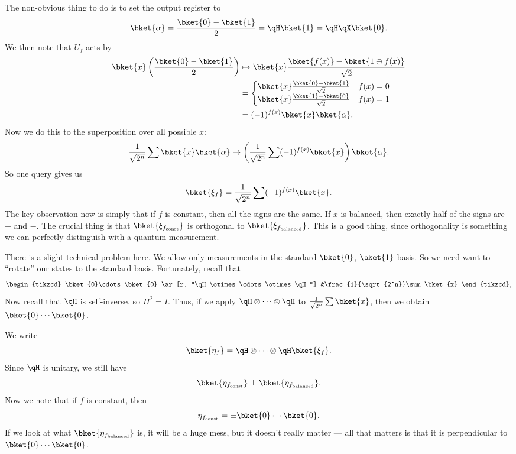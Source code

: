 \documentclass[a4paper]{article}
\begin{document}
\begin{eg}
  The non-obvious thing to do is to set the output register to
  \[
    \bket{\alpha} = \frac{\bket{0} - \bket{1}}{2} = \qH\bket{1} = \qH \qX \bket{0}.
  \]
  We then note that $U_f$ acts by
  \begin{align*}
    \bket{x}\left(\frac{\bket{0} - \bket{1}}{2}\right) &\mapsto \bket{x} \frac{\bket{f(x)} - \bket{1 \oplus f(x)}}{\sqrt{2}}\\
    &=
    \begin{cases}
      \bket{x}\frac{\bket{0} - \bket{1}}{\sqrt{2}}& f(x) = 0\\
      \bket{x}\frac{\bket{1} - \bket{0}}{\sqrt{2}}& f(x) = 1\\
    \end{cases}\\
    &= (-1)^{f(x)}\bket{x}\bket{\alpha}.
  \end{align*}
  Now we do this to the superposition over all possible $x$:
  \[
    \frac{1}{\sqrt{2^n}} \sum \bket{x}\bket{\alpha} \mapsto \left(\frac{1}{\sqrt{2^n}} \sum (-1)^{f(x)}\bket{x}\right) \bket{\alpha}.
  \]
  So one query gives us
  \[
    \bket{\xi_f} = \frac{1}{\sqrt{2^n}} \sum (-1)^{f(x)}\bket{x}.
  \]
  The key observation now is simply that if $f$ is constant, then all the signs are the same. If $x$ is balanced, then exactly half of the signs are $+$ and $-$. The crucial thing is that $\bket{\xi_{f_\text{const}}}$ is orthogonal to $\bket{\xi_{f_\text{balanced}}}$. This is a good thing, since orthogonality is something we can perfectly distinguish with a quantum measurement.

  There is a slight technical problem here. We allow only measurements in the standard $\bket{0}$, $\bket{1}$ basis. So we need want to ``rotate'' our states to the standard basis. Fortunately, recall that
  \[
    \begin{tikzcd}
      \bket{0}\cdots\bket{0} \ar[r, "\qH\otimes \cdots\otimes \qH"] &\frac{1}{\sqrt{2^n}}\sum \bket{x}
    \end{tikzcd},
  \]
  Now recall that $\qH$ is self-inverse, so $H^2 = I$. Thus, if we apply $\qH \otimes\cdots \otimes \qH$ to $\frac{1}{\sqrt{2^n}}\sum \bket{x}$, then we obtain $\bket{0}\cdots\bket{0}$.

  We write
  \[
    \bket{\eta_f} = \qH \otimes \cdots \otimes \qH \bket{\xi_f}.
  \]
  Since $\qH$ is unitary, we still have
  \[
    \bket{\eta_{f_\mathrm{const}}} \perp \bket{\eta_{f_\mathrm{balanced}}}.
  \]
  Now we note that if $f$ is constant, then
  \[
    \eta_{f_\mathrm{const}} = \pm \bket{0}\cdots\bket{0}.
  \]
  If we look at what $\bket{\eta_{f_\mathrm{balanced}}}$ is, it will be a huge mess, but it doesn't really matter --- all that matters is that it is perpendicular to $\bket{0}\cdots\bket{0}$.


\end{eg}
\end{document}
